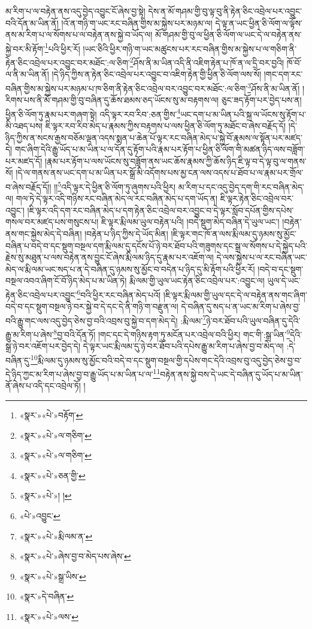 མ་རིག་པ་ལ་བརྟེན་ནས་འདུ་བྱེད་འབྱུང་ངོ་ཞེས་བྱ་སྟེ། དེས་ན་མོ་གཤམ་གྱི་བུ་ལྟ་བུ་ནི་རྟེན་ཅིང་འབྲེལ་པར་འབྱུང་བའི་དོན་མ་ཡིན་ནོ། །འོ་ན་གཉི་ག་ཡང་རང་བཞིན་གྱིས་མ་སྐྱེས་པར་མཉམ་ལ། དེ་ལྟ་ན་ཡང་ཕྱིན་ཅི་ལོག་ལ་ལྟོས་ནས་མ་རིག་པ་ལ་སོགས་པ་ལ་བརྟེན་ནས་སྐྱེ་བ་ཡོད་ལ། མོ་གཤམ་གྱི་བུ་ལ་ཕྱིན་ཅི་ལོག་ལ་ཡང་དེ་ལ་བརྟེན་ནས་སྐྱེ་བར་མི་རྟོག་\footnote{«སྣར་»«པེ་»བརྟོག་}པའི་ཕྱིར་རོ། །ཡང་ཅིའི་ཕྱིར་གཉི་ག་ཡང་མཚུངས་པར་རང་བཞིན་གྱིས་མ་སྐྱེས་པ་ལ་གཅིག་ནི་རྟེན་ཅིང་འབྲེལ་པར་འབྱུང་བར་མཐོང་:ལ་ཅིག་\footnote{«སྣར་»«པེ་»ལ་གཅིག་}ཤོས་ནི་མ་ཡིན་འདི་ནི་འཇིག་རྟེན་པ་ཁོ་ན་ལ་དྲི་བར་བྱའི། ཁོ་བོ་ལ་ནི་མ་ཡིན་ནོ། །དེ་ཉིད་ཀྱིས་ན་རྟེན་ཅིང་འབྲེལ་པར་འབྱུང་བ་འཇིག་རྟེན་གྱི་ཕྱིན་ཅི་ལོག་ལས་སོ། །གང་དག་རང་བཞིན་གྱིས་མ་སྐྱེས་པར་མཉམ་པ་ཁ་ཅིག་ནི་རྟེན་ཅིང་འབྲེལ་བར་འབྱུང་བར་མཐོང་:ལ་ཅིག་\footnote{«སྣར་»«པེ་»ལ་གཅིག་}ཤོས་ནི་མ་ཡིན་ནོ། །རིགས་པས་ནི་མོ་གཤམ་གྱི་བུ་བཞིན་དུ་ཆོས་ཐམས་ཅད་ཡོངས་སུ་མ་བརྟགས་ལ། ཅུང་ཟད་རྟོག་པར་བྱེད་པས་ན། ཕྱིན་ཅི་ལོག་ཏུ་རྣམ་པར་གཞག་སྟེ། འདི་ལྟར་རབ་རིབ་:ཅན་གྱིས་\footnote{«སྣར་»«པེ་»ཅན་གྱི་}ཡང་དག་པ་མ་ཡིན་པའི་སྐྲ་ལ་ཡོངས་སུ་རྟོག་པ་མི་འཐད་པས། ཇི་ལྟར་རབ་རིབ་མེད་པ་རྣམས་ཀྱིས་བརྟགས་པ་ལས་ཕྱིན་ཅི་ལོག་ཏུ་མཐོང་བ་ཞེས་བརྗོད་དོ། །དེ་ཉིད་ཀྱིས་ན་སངས་རྒྱས་བཅོམ་ལྡན་འདས་སྨན་པ་ཆེན་པོ་ལྟར་རང་བཞིན་མེད་པ་སྐྱེ་བོ་རྣམས་ལ་སྟོན་པར་མཛད་དེ། གང་ཞིག་དེའི་རྒྱུ་ཡོད་པ་མ་ཡིན་པ་ལ་དོན་དུ་རྟོག་པའི་རྣམ་པར་རྟོག་པ་ཕྱིན་ཅི་ལོག་གི་མཚན་ཉིད་ལས་བཟློག་པར་མཛད་དོ། །རྣམ་པར་རྟོག་པ་ལས་ཡོངས་སུ་བཟློག་ནས་ཡང་ཆོས་རྣམས་ཀྱི་ཆོས་ཉིད་ཇི་ལྟ་བ་དེ་ལྟ་བུ་ལ་གནས་སོ། །དེ་ལ་གནས་ནས་ཡང་དག་པ་མ་ཡིན་པར་སྒྲོ་མི་འདོགས་པས་མྱ་ངན་ལས་འདས་པ་ཐོབ་པ་ལ་རྣམ་པར་གྲོལ་བ་ཞེས་བརྗོད་དོ།། །།\footnote{«སྣར་»«པེ་»། །}འདི་ལྟར་དེ་ཕྱིན་ཅི་ལོག་ཏུ་ཞུགས་པའི་ཕྱིར། མ་རིག་པ་དང་འདུ་བྱེད་དག་གི་རང་བཞིན་མེད་ལ། གལ་ཏེ་དེ་ལྟར་འདི་གཉིས་རང་བཞིན་མེད་ལ་རང་བཞིན་མེད་པ་དག་ཡོད་ན། ཇི་ལྟར་རྟེན་ཅིང་འབྲེལ་བར་འབྱུང་། །ཇི་ལྟར་འདི་དག་རང་བཞིན་མེད་པ་དག་རྟེན་ཅིང་འབྲེལ་བར་འབྱུང་བ་དེ་ལྟར་སློབ་དཔོན་གྱིས་དཔེས་གསལ་བར་མཛད་པས་གསུངས་པ། ཇི་ལྟར་རྨི་ལམ་ཡུལ་བརྟེན་པའི། །བདེ་སྡུག་མེད་བཞིན་དེ་ཡུལ་ཡང་། །བརྟེན་ནས་གང་སྐྱེས་མེད་དེ་བཞིན། །བརྟེན་པ་ཉིད་ཀྱིས་དེ་ཡོད་མིན། །ཇི་ལྟར་གང་ཁོ་ན་ལས་རྨི་ལམ་དུ་ཉམས་སུ་མྱོང་བཞིན་པ་བདེ་བ་དང་སྡུག་བསྔལ་དག་རྨི་ལམ་དུ་དངོས་པོ་ཉེ་བར་ཐོབ་པའི་གཟུགས་དང་སྒྲ་ལ་སོགས་པ་དེ་སྐྱེད་པའི་རྗེས་སུ་མཐུན་པ་ལས་བརྟེན་ནས་བྱུང་ངོ་ཞེས་རྨི་ལམ་ཉིད་དུ་རྣམ་པར་འཇོག་ལ། དེ་ལས་སྐྱེས་པ་ལ་རང་བཞིན་ཡང་མེད་ལ་རྨི་ལམ་ཡང་སད་པ་ན་དེ་བཞིན་དུ་ཉམས་སུ་མྱོང་བ་བདེན་པ་ཉིད་དུ་མི་རྟོག་པའི་ཕྱིར་རོ། །བདེ་བ་དང་སྡུག་བསྔལ་འབའ་ཞིག་ངོ་བོ་ཉིད་མེད་པ་མ་ཡིན་ཏེ། རྨི་ལམ་གྱི་ཡུལ་ཡང་རྟེན་ཅིང་འབྲེལ་པར་:འབྱུང་ལ། ཡུལ་དེ་ཡང་རྟེན་ཅིང་འབྲེལ་པར་འབྱུང་\footnote{«པེ་»འབྱུང་}བའི་ཕྱིར་རང་བཞིན་མེད་པའོ། །ཇི་ལྟར་རྨི་ལམ་གྱི་ཡུལ་དང་དེ་ལ་བརྟེན་ནས་གང་ཞིག་བདེ་བ་དང་སྡུག་བསྔལ་ཉེ་བར་སྐྱེ་བ་དེ་དང་དེ་ནི་གཉི་ག་བརྫུན་ལ། དེ་བཞིན་དུ་སད་པ་ན་ཡང་མ་རིག་པ་ཞེས་བྱ་བའི་རྒྱུ་གང་ལས་འདུ་བྱེད་ཅེས་བྱ་བའི་འབྲས་བུ་སྐྱེ་བ་དག་མེད་དེ། :རྨི་ལམ་\footnote{«སྣར་»«པེ་»རྨི་ལམ་ན་}ཉེ་བར་ཐོབ་པའི་ཡུལ་བཞིན་དུ་དེའི་རྒྱུ་མ་རིག་པ་ཞེས་\footnote{«སྣར་»«པེ་»ཞེས་བྱ་བ་མེད་པས་ཞེས་}བྱ་བའི་དོན་ཏོ། །གང་དང་དེ་གཉིས་རྟག་ཏུ་མངོན་པར་འབྲེལ་བའི་ཕྱིར། གང་གི་:སྒྲ་ཡིན་\footnote{«སྣར་»«པེ་»སྒྲ་ཡིས་}དེའི་སྒྲ་ཉེ་བར་འཇོག་པར་བྱེད་དེ། དེ་ལྟར་ཡང་རྨི་ལམ་དུ་ཉེ་བར་ཐོབ་པའི་དཔེས་རྒྱུ་མ་རིག་པ་ཞེས་བྱ་བ་མེད་ལ། :དེ་བཞིན་དུ་\footnote{«སྣར་»དེ་བཞིན་}རྨི་ལམ་དུ་ཉམས་སུ་མྱོང་བའི་བདེ་བ་དང་སྡུག་བསྔལ་གྱི་དཔེས་གང་དེའི་འབྲས་བུ་འདུ་བྱེད་ཅེས་བྱ་བ་དེ་ཉིད་ཀྱང་མ་རིག་པ་ཞེས་བྱ་བ་རྒྱུ་ཡོད་པ་མ་ཡིན་པ་ལ་\footnote{«སྣར་»«པེ་»ལས་}བརྟེན་ནས་སྐྱེ་བས་དེ་ཡང་དེ་བཞིན་དུ་ཡོད་པ་མ་ཡིན་ནོ་ཞེས་པ་འདི་དང་འབྲེལ་ཏོ། །
